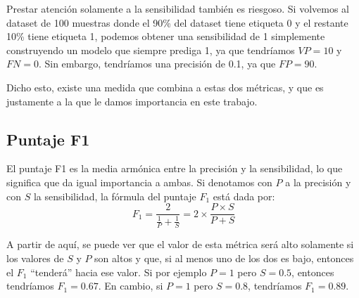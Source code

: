 \documentclass[../../main.tex]{subfiles}
\begin{document}
Prestar atención solamente a la sensibilidad también es riesgoso. Si volvemos al dataset
de 100 muestras donde el 90\% del dataset tiene etiqueta 0 y el restante 10\% tiene
etiqueta 1, podemos obtener una sensibilidad de 1 simplemente construyendo un modelo que
siempre prediga 1, ya que tendríamos \(VP=10\) y \(FN=0\). Sin embargo, tendríamos
una precisión de 0.1, ya que \(FP=90\).

Dicho esto, existe una medida que combina a estas dos métricas, y que es justamente
a la que le damos importancia en este trabajo.

\subsection{Puntaje F1}
El puntaje F1 es la media armónica entre la precisión y la sensibilidad, lo que significa
que da igual importancia a ambas. Si denotamos con \(P\) a la precisión y con \(S\) la
sensibilidad, la fórmula del puntaje \(F_1\) está dada por:
\[
    F_1 = \frac{2}{\frac{1}{P} + \frac{1}{S}} = 2 \times \frac{P \times S}{P + S}
\]

A partir de aquí, se puede ver que el valor de esta métrica será alto solamente si los
valores de \(S\) y \(P\) son altos y que, si al menos uno de los dos es bajo, entonces el
\(F_1\) ``tenderá'' hacia ese valor. Si por ejemplo \(P=1\) pero \(S=0.5\), entonces
tendríamos \(F_1 = 0.67\). En cambio, si \(P=1\) pero \(S=0.8\), tendríamos \(F_1 =
0.89\).
\end{document}
